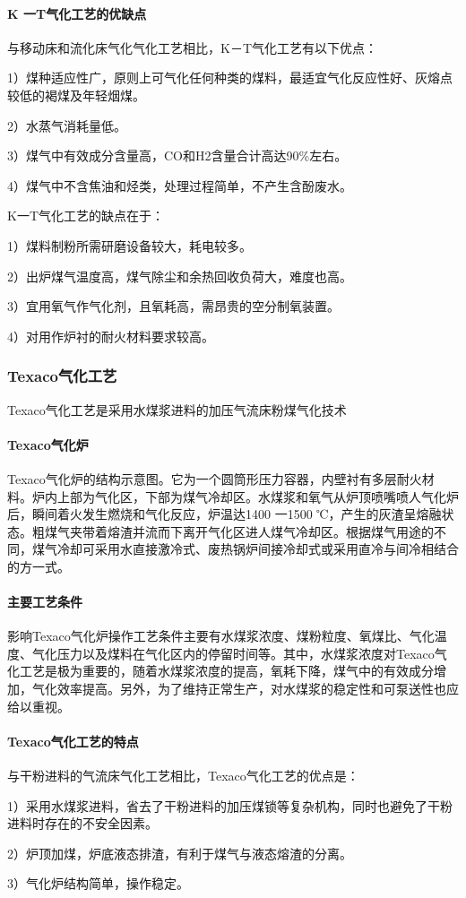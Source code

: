 \documentclass[10pt,openany]{ctexbook}
\begin{document}
 \paragraph{K 一T气化工艺的优缺点}
与移动床和流化床气化气化工艺相比，K－T气化工艺有以下优点：\par
   1）煤种适应性广，原则上可气化任何种类的煤料，最适宜气化反应性好、灰熔点较低的褐煤及年轻烟煤。\par
   2）水蒸气消耗量低。\par
   3）煤气中有效成分含量高，CO和H2含量合计高达90\%左右。 \par
   4）煤气中不含焦油和烃类，处理过程简单，不产生含酚废水。\par
K一T气化工艺的缺点在于：\par
   1）煤料制粉所需研磨设备较大，耗电较多。\par
   2）出炉煤气温度高，煤气除尘和余热回收负荷大，难度也高。\par
   3）宜用氧气作气化剂，且氧耗高，需昂贵的空分制氧装置。\par
   4）对用作炉衬的耐火材料要求较高。\par
\subsubsection{Texaco气化工艺}
Texaco气化工艺是采用水煤浆进料的加压气流床粉煤气化技术
\paragraph{Texaco气化炉}
Texaco气化炉的结构示意图。它为一个圆筒形压力容器，内壁衬有多层耐火材料。炉内上部为气化区，下部为煤气冷却区。水煤浆和氧气从炉顶喷嘴喷人气化炉后，瞬间着火发生燃烧和气化反应，炉温达1400 一1500 ℃，产生的灰渣呈熔融状态。粗煤气夹带着熔渣并流而下离开气化区进人煤气冷却区。根据煤气用途的不同，煤气冷却可采用水直接激冷式、废热锅炉间接冷却式或采用直冷与间冷相结合的方一式。
\paragraph{主要工艺条件}
影响Texaco气化炉操作工艺条件主要有水煤浆浓度、煤粉粒度、氧煤比、气化温度、气化压力以及煤料在气化区内的停留时间等。其中，水煤浆浓度对Texaco气化工艺是极为重要的，随着水煤浆浓度的提高，氧耗下降，煤气中的有效成分增加，气化效率提高。另外，为了维持正常生产，对水煤浆的稳定性和可泵送性也应给以重视。
\paragraph{Texaco气化工艺的特点}
与干粉进料的气流床气化工艺相比，Texaco气化工艺的优点是：\par
1）采用水煤浆进料，省去了干粉进料的加压煤锁等复杂机构，同时也避免了干粉进料时存在的不安全因素。\par
2）炉顶加煤，炉底液态排渣，有利于煤气与液态熔渣的分离。\par
3）气化炉结构简单，操作稳定。\par
\end{document}
